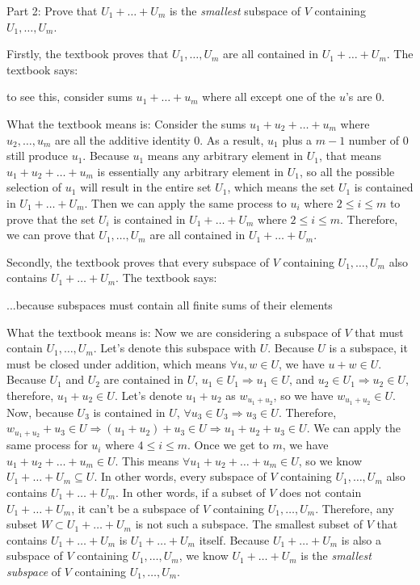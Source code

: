 \documentclass[12pt, letterpaper, oneside]{book}
\begin{document}
Part 2: Prove that $U_1 + \ldots + U_m$ is the \textit{smallest} subspace of
$V$ containing $U_1, \ldots, U_m$.

Firstly, the textbook proves that $U_1, \ldots, U_m$ are all contained in
$U_1 + \ldots + U_m$. The textbook says:

\begin{displayquote}
  to see this, consider sums $u_1 + \ldots + u_m$ where all except one of the
  $u$'s are 0.
\end{displayquote}

What the textbook means is: Consider the sums $u_1 + u_2 + \ldots + u_m$ where
$u_2, \ldots, u_m$ are all the additive identity $0$. As a result, $u_1$ plus a
$m-1$ number of $0$ still produce $u_1$. Because $u_1$ means any arbitrary
element in $U_1$, that means $u_1 + u_2 + \ldots + u_m$ is essentially any
arbitrary element in $U_1$, so all the possible selection of $u_1$ will result
in the entire set $U_1$, which means the set $U_1$ is contained in $U_1 +
\ldots + U_m$. Then we can apply the same process to $u_i$ where $2 \leq i \leq
m$ to prove that the set $U_i$ is contained in $U_1 + \ldots + U_m$ where $2
\leq i \leq m$. Therefore, we can prove that $U_1, \ldots, U_m$ are all
contained in $U_1 + \ldots + U_m$.

Secondly, the textbook proves that every subspace of $V$ containing $U_1,
\ldots, U_m$ also contains $U_1 + \ldots + U_m$. The textbook says:

\begin{displayquote}
  ...because subspaces must contain all finite sums of their elements
\end{displayquote}

What the textbook means is: Now we are considering a subspace of $V$ that
must contain $U_1, \ldots, U_m$. Let's denote this subspace with $U$. Because
$U$ is a subspace, it must be closed under addition, which means $\forall u, w
\in U$, we have $u + w \in U$. Because $U_1$ and $U_2$ are contained in $U$,
$u_1 \in U_1 \Rightarrow u_1 \in U$, and $u_2 \in U_1 \Rightarrow u_2 \in U$,
therefore, $u_1 + u_2 \in U$. Let's denote $u_1 + u_2$ as $w_{u_1+u_2}$, so we
have $w_{u_1+u_2} \in U$. Now, because $U_3$ is contained in $U$, $\forall u_3
\in U_3 \Rightarrow u_3 \in U$. Therefore, $w_{u_1+u_2} + u_3 \in U \Rightarrow
(u_1 + u_2) + u_3 \in U \Rightarrow u_1 + u_2 + u_3 \in U$. We can apply the
same process for $u_i$ where $4 \leq i \leq m$. Once we get to $m$, we have
$u_1 + u_2 + \ldots + u_m \in U$. This means $\forall u_1 + u_2 + \ldots + u_m
\in U$, so we know $U_1 + \ldots + U_m \subseteq U$. In other words, every
subspace of $V$ containing $U_1, \ldots, U_m$ also contains $U_1 + \ldots +
U_m$. In other words, if a subset of $V$ does not contain $U_1 + \ldots + U_m$,
it can't be a subspace of $V$ containing $U_1, \ldots, U_m$. Therefore, any
subset $W \subset U_1 + \ldots + U_m$ is not such a subspace. The smallest
subset of $V$ that contains $U_1 + \ldots + U_m$ is $U_1 + \ldots + U_m$
itself. Because $U_1 + \ldots + U_m$ is also a subspace of $V$ containing $U_1,
\ldots, U_m$, we know $U_1 + \ldots + U_m$ is the \textit{smallest subspace} of
$V$ containing $U_1, \ldots, U_m$.
\end{document}
